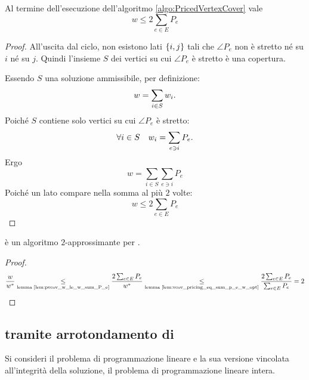 \begin{lemma}\label{lem:pvcov_w_le_w_sum_P_e}
	Al termine dell'esecuzione dell'algoritmo \ref{algo:PricedVertexCover} vale
	\begin{equation*}
		w \leq 2 \sum_{e \in E} P_e
	\end{equation*}
\end{lemma}
\begin{proof}
	All'uscita dal ciclo, non esistono lati $\set{i,j}$ tali che $\angle{P_e}$ non è stretto né su $i$ né su $j$.
	Quindi l'insieme $S$ dei vertici su cui $\angle{P_e}$ è stretto è una copertura.

	Essendo $S$ una soluzione ammissibile, per definizione:
	\begin{equation*}
		w = \sum_{i\in S} w_i \text.
	\end{equation*}
	Poiché $S$ contiene solo vertici su cui $\angle{P_e}$ è stretto:
	\begin{equation*}
		\forall i\in S \quad w_i = \sum_{e\ni i} P_e \text.
	\end{equation*}
	Ergo
	\begin{equation*}
		w = \sum_{i\in S} \sum_{e\ni i} P_e
	\end{equation*}
	Poiché un lato compare nella somma al più $2$ volte:
	\begin{equation*}
		w \leq 2 \sum_{e\in E} P_e
	\end{equation*}
\end{proof}

\begin{theorem}
	\PricedVertexCover è un algoritmo $2$-approssimante per \VertexCover.
\end{theorem}
\begin{proof}
	\begin{equation*}
		\frac{w}{w\star} \underset{\text{lemma \ref{lem:pvcov_w_le_w_sum_P_e}}}{\leq}
		\frac{2\sum_{e\in E} P_e}{w\star} \underset{\text{lemma \ref{lem:vcov_pricing_eq_sum_p_e_w_opt}}}{\leq}
		\frac{2\sum_{e\in E} P_e}{\sum_{e\in E} P_e} = 2
	\end{equation*}
\end{proof}


\subsection{\VertexCover tramite arrotondamento di \LinearProgramming}
Si consideri il problema di programmazione lineare e la sua versione vincolata all'integrità della soluzione, il problema di programmazione lineare intera.

